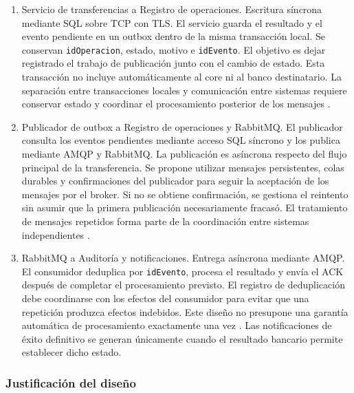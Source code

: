 \documentclass[12pt,a4paper]{article}
\begin{document}
\begin{enumerate}
    \item Servicio de transferencias a Registro de operaciones.
    Escritura síncrona mediante SQL sobre TCP con TLS.
    El servicio guarda el resultado y el evento pendiente
    en un outbox dentro de la misma transacción local.
    Se conservan \texttt{idOperacion}, estado, motivo e
    \texttt{idEvento}. El objetivo es dejar registrado el
    trabajo de publicación junto con el cambio de estado.
    Esta transacción no incluye automáticamente al core
    ni al banco destinatario. La separación entre
    transacciones locales y comunicación entre sistemas
    requiere conservar estado y coordinar el procesamiento
    posterior de los mensajes \cite{helland2017}.

    \item Publicador de outbox a Registro de operaciones
    y RabbitMQ.
    El publicador consulta los eventos pendientes mediante
    acceso SQL síncrono y los publica mediante AMQP y
    RabbitMQ. La publicación es asíncrona respecto del
    flujo principal de la transferencia. Se propone utilizar
    mensajes persistentes, colas durables y confirmaciones
    del publicador para seguir la aceptación de los mensajes
    por el broker. Si no se obtiene confirmación, se gestiona
    el reintento sin asumir que la primera publicación
    necesariamente fracasó. El tratamiento de mensajes
    repetidos forma parte de la coordinación entre sistemas
    independientes \cite{helland2017}.

    \item RabbitMQ a Auditoría y notificaciones.
    Entrega asíncrona mediante AMQP. El consumidor deduplica
    por \texttt{idEvento}, procesa el resultado y envía
    el ACK después de completar el procesamiento previsto.
    El registro de deduplicación debe coordinarse con los
    efectos del consumidor para evitar que una repetición
    produzca efectos indebidos. Este diseño no presupone
    una garantía automática de procesamiento exactamente
    una vez \cite{helland2017}.
    Las notificaciones de éxito definitivo se generan
    únicamente cuando el resultado bancario permite
    establecer dicho estado.

\end{enumerate}

\subsubsection{Justificación del diseño}
\end{document}

